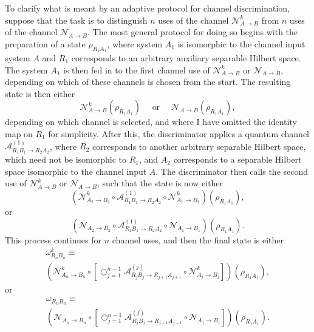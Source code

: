 \documentclass[apsrev,twocolumn]{revtex4-1}%
\begin{document}
To clarify what is meant by an adaptive protocol for channel discrimination,
suppose that the task is to distinguish $n$ uses of the channel $\mathcal{N}%
_{A\rightarrow B}^{k}$ from $n$ uses of the channel $\mathcal{N}_{A\rightarrow
B}$. The most general protocol for doing so begins with the preparation of a
state $\rho_{R_{1}A_{1}}$, where system $A_{1}$ is isomorphic to the channel
input system $A$ and $R_{1}$ corresponds to an arbitrary auxiliary separable
Hilbert space. The system $A_{1}$ is then fed in to the first channel use of
$\mathcal{N}_{A\rightarrow B}^{k}$ or $\mathcal{N}_{A\rightarrow B}$,
depending on which of these channels is chosen from the start. The resulting
state is then either%
\begin{equation}
\mathcal{N}_{A\rightarrow B}^{k}(\rho_{R_{1}A_{1}}) \quad\text{ or }
\quad\mathcal{N}_{A\rightarrow B}(\rho_{R_{1}A_{1}}),
\end{equation}
depending on which channel is selected, and where I have omitted the identity
map on $R_{1}$ for simplicity. After this, the discriminator applies a quantum
channel $\mathcal{A}_{R_{1}B_{1}\rightarrow R_{2}A_{2}}^{(1)}$, where $R_{2}$
corresponds to another arbitrary separable Hilbert space, which need not be
isomorphic to $R_{1}$, and $A_{2}$ corresponds to a separable Hilbert space
isomorphic to the channel input $A$. The discriminator then calls the second
use of $\mathcal{N}_{A\rightarrow B}^{k}$ or $\mathcal{N}_{A\rightarrow B}$,
such that the state is now either%
\begin{equation}
(\mathcal{N}_{A_{2}\rightarrow B_{2}}^{k}\circ\mathcal{A}_{R_{1}%
B_{1}\rightarrow R_{2}A_{2}}^{(1)}\circ\mathcal{N}_{A_{1}\rightarrow B_{1}%
}^{k})(\rho_{R_{1}A_{1}}),
\end{equation}
or%
\begin{equation}
(\mathcal{N}_{A_{2}\rightarrow B_{2}}\circ\mathcal{A}_{R_{1}B_{1}\rightarrow
R_{2}A_{2}}^{(1)}\circ\mathcal{N}_{A_{1}\rightarrow B_{1}})(\rho_{R_{1}A_{1}%
}).
\end{equation}
This process continues for $n$ channel uses, and then the final state is
either%
\begin{multline}
\omega_{R_{n}B_{n}}^{k}\equiv\label{eq:omega-k}\\
\left(  \mathcal{N}_{A_{n}\rightarrow B_{n}}^{k}\circ\left[  \bigcirc
_{j=1}^{n-1}\mathcal{A}_{R_{j}B_{j}\rightarrow R_{j+1}A_{j+1}}^{(j)}%
\circ\mathcal{N}_{A_{j}\rightarrow B_{j}}^{k}\right]  \right)  (\rho
_{R_{1}A_{1}}),
\end{multline}
or%
\begin{multline}
\omega_{R_{n}B_{n}}\equiv\label{eq:omega}\\
\left(  \mathcal{N}_{A_{n}\rightarrow B_{n}}\circ\left[  \bigcirc_{j=1}%
^{n-1}\mathcal{A}_{R_{j}B_{j}\rightarrow R_{j+1}A_{j+1}}^{(j)}\circ
\mathcal{N}_{A_{j}\rightarrow B_{j}}\right]  \right)  (\rho_{R_{1}A_{1}}).
\end{multline}
\end{document}
